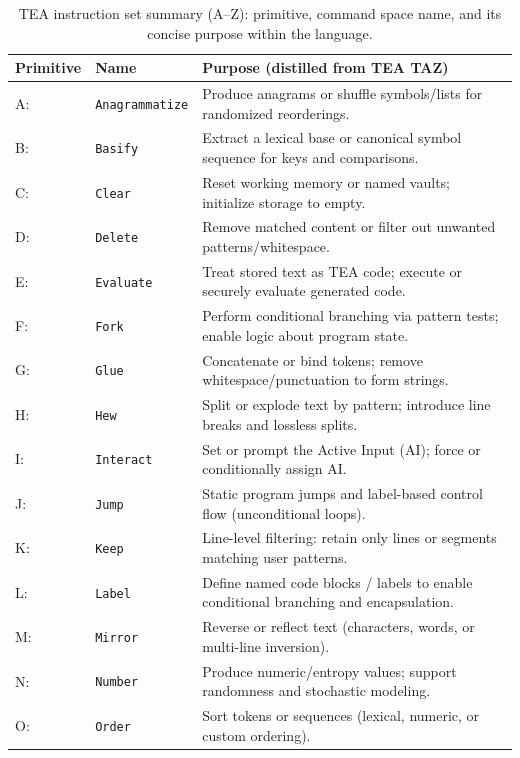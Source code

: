 \documentclass[acmtoplas]{acmart}
\begin{document}
\begin{table}[ht]
  \centering
  \small
  \caption{TEA instruction set summary (A--Z): primitive, command space name, and its concise purpose within the language.}
  \label{tab:tea-az-minimal}
  \begin{tabular}{@{}p{} p{} p{}@{}}
    \toprule
    \textbf{Primitive} & \textbf{Name} & \textbf{Purpose (distilled from TEA TAZ)} \\
    \midrule
    A: & \texttt{Anagrammatize} & Produce anagrams or shuffle symbols/lists for randomized reorderings. \\
    B: & \texttt{Basify} & Extract a lexical base or canonical symbol sequence for keys and comparisons. \\
    C: & \texttt{Clear} & Reset working memory or named vaults; initialize storage to empty. \\
    D: & \texttt{Delete} & Remove matched content or filter out unwanted patterns/whitespace. \\
    E: & \texttt{Evaluate} & Treat stored text as TEA code; execute or securely evaluate generated code. \\
    F: & \texttt{Fork} & Perform conditional branching via pattern tests; enable logic about program state. \\
    G: & \texttt{Glue} & Concatenate or bind tokens; remove whitespace/punctuation to form strings. \\
    H: & \texttt{Hew} & Split or explode text by pattern; introduce line breaks and lossless splits. \\
    I: & \texttt{Interact} & Set or prompt the Active Input (AI); force or conditionally assign AI. \\
    J: & \texttt{Jump} & Static program jumps and label-based control flow (unconditional loops). \\
    K: & \texttt{Keep} & Line-level filtering: retain only lines or segments matching user patterns. \\
    L: & \texttt{Label} & Define named code blocks / labels to enable conditional branching and encapsulation. \\
    M: & \texttt{Mirror} & Reverse or reflect text (characters, words, or multi-line inversion). \\
    N: & \texttt{Number} & Produce numeric/entropy values; support randomness and stochastic modeling. \\
    O: & \texttt{Order} & Sort tokens or sequences (lexical, numeric, or custom ordering). \\

\end{tabular}
\end{table}
\end{document}
